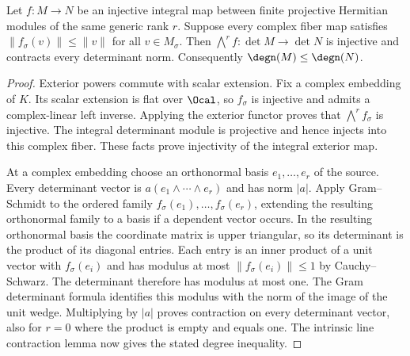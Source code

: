 \begin{lemma}
\label{lem:determinant-contraction}
\leanok
Let $f:M\to N$ be an injective integral map between finite projective
Hermitian modules of the same generic rank $r$. Suppose every complex
fiber map satisfies $\|f_\sigma(v)\|\leq\|v\|$ for all $v\in M_\sigma$.
Then $\bigwedge^r f:\det M\to\det N$ is injective and contracts
every determinant norm. Consequently $\degn(M)\leq\degn(N)$.
\end{lemma}
\begin{proof}
Exterior powers commute with scalar extension. Fix a complex embedding
of $K$. Its scalar extension is flat over $\Ocal$, so $f_\sigma$ is
injective and admits a complex-linear left inverse. Applying the exterior
functor proves that $\bigwedge^r f_\sigma$ is injective. The integral
determinant module is projective and hence injects into this complex
fiber. These facts prove injectivity of the integral exterior map.

At a complex embedding choose an orthonormal basis $e_1,\ldots,e_r$
of the source. Every determinant vector is $a(e_1\wedge\cdots\wedge e_r)$
and has norm $|a|$. Apply Gram--Schmidt to the ordered family
$f_\sigma(e_1),\ldots,f_\sigma(e_r)$, extending the resulting orthonormal
family to a basis if a dependent vector occurs. In the resulting
orthonormal basis the coordinate matrix is upper triangular, so its
determinant is the product of its diagonal entries. Each entry is an
inner product of a unit vector with $f_\sigma(e_i)$ and has modulus at
most $\|f_\sigma(e_i)\|\leq1$ by Cauchy--Schwarz. The determinant
therefore has modulus at most one. The Gram determinant formula identifies
this modulus with the norm of the image of the unit wedge. Multiplying
by $|a|$ proves contraction on every determinant vector, also for $r=0$
where the product is empty and equals one. The intrinsic line contraction
lemma now gives the stated degree inequality.
\end{proof}

